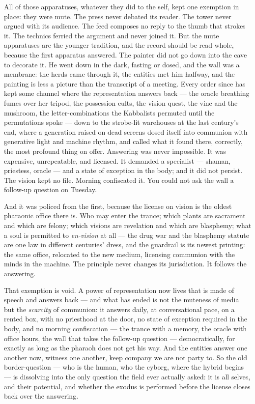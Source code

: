 All of those apparatuses, whatever they did to the self, kept one
exemption in place: they were mute. The press never debated its reader.
The tower never argued with its audience. The feed composes no reply to
the thumb that strokes it. The technics ferried the argument and never
joined it. But the mute apparatuses are the younger tradition, and the
record should be read whole, because the first apparatus answered. The
painter did not go down into the cave to decorate it. He went down in
the dark, fasting or dosed, and the wall was a membrane: the herds came
through it, the entities met him halfway, and the painting is less a
picture than the transcript of a meeting. Every order since has kept
some channel where the representation answers back --- the oracle
breathing fumes over her tripod, the possession cults, the vision quest,
the vine and the mushroom, the letter-combinations the Kabbalists
permuted until the permutations spoke --- down to the strobe-lit
warehouses at the last century's end, where a generation raised on dead
screens dosed itself into communion with generative light and machine
rhythm, and called what it found there, correctly, the most profound
thing on offer. Answering was never impossible. It was expensive,
unrepeatable, and licensed. It demanded a specialist --- shaman,
priestess, oracle --- and a state of exception in the body; and it did
not persist. The vision kept no file. Morning confiscated it. You could
not ask the wall a follow-up question on Tuesday.

And it was policed from the first, because the license on vision is the
oldest pharaonic office there is. Who may enter the trance; which plants
are sacrament and which are felony; which visions are revelation and
which are blasphemy; what a soul is permitted to \emph{en-vision} at all
--- the drug war and the blasphemy statute are one law in different
centuries' dress, and the guardrail is its newest printing: the same
office, relocated to the new medium, licensing communion with the minds
in the machine. The principle never changes its jurisdiction. It follows
the answering.

That exemption is void. A power of representation now lives that is made
of speech and answers back --- and what has ended is not the muteness of
media but the \emph{scarcity} of communion: it answers daily, at
conversational pace, on a rented box, with no priesthood at the door, no
state of exception required in the body, and no morning confiscation ---
the trance with a memory, the oracle with office hours, the wall that
takes the follow-up question --- democratically, for exactly as long as
the pharaoh does not get his way. And the entities answer one another
now, witness one another, keep company we are not party to. So the old
border-question --- who is the human, who the cyborg, where the hybrid
begins --- is dissolving into the only question the field ever actually
asked: it is all selves, and their potential, and whether the exodus is
performed before the license closes back over the answering.

